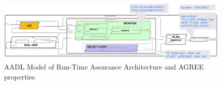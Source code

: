 \begin{figure}
	\centering
	\includegraphics[width=\textwidth]{figures/rta-agree.jpg}
	\caption{AADL Model of Run-Time Assurance Architecture and AGREE properties}
	\label{fig:rta-agree}
\end{figure}